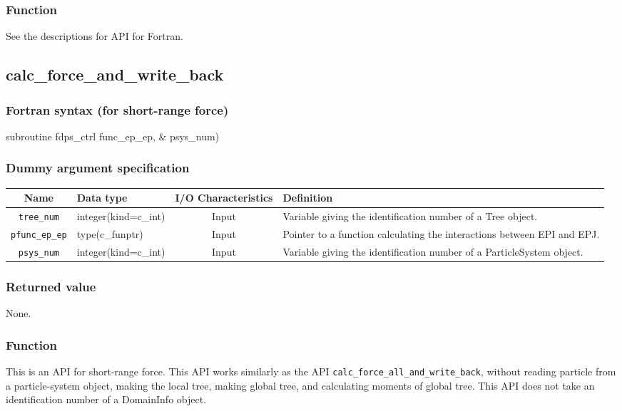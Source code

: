 \subsubsection*{Function}
See the descriptions for API for Fortran.
\clearpage

\subsection{calc\_force\_and\_write\_back}
\subsubsection*{Fortran syntax (for short-range force)}
\begin{screen}
\begin{spverbatim}
subroutine fdps_ctrl%
                                               func_ep_ep, &
                                               psys_num)
\end{spverbatim}
\end{screen}

\subsubsection*{Dummy argument specification}
\begin{table}[h]
\begin{tabularx}{\linewidth}{clcX}
\toprule
\rowcolor{Snow2}
Name & Data type & I/O Characteristics & Definition \\
\midrule
\verb|tree_num|    & integer(kind=c\_int)   & Input     & Variable giving the identification number of a Tree object. \\
\verb|pfunc_ep_ep| & type(c\_funptr)        & Input     & Pointer to a function calculating the interactions between EPI and EPJ. \\
\verb|psys_num|    & integer(kind=c\_int)   & Input     & Variable giving the identification number of a ParticleSystem object. \\
\bottomrule
\end{tabularx}
\end{table}

\subsubsection*{Returned value}
None.

\subsubsection*{Function}
This is an API for short-range force. This API works similarly as the API \texttt{calc\_force\_all\_and\_write\_back}, without reading particle from a particle-system object, making the local tree, making global tree, and calculating moments of global tree. This API does not take an identification number of a DomainInfo object.
\clearpage

